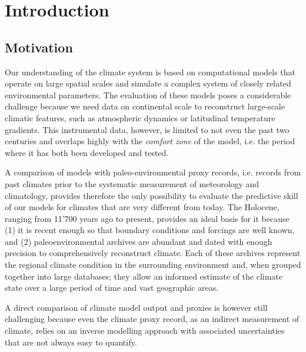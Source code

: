 
\chapter{Introduction}

\label{chp:intro}

\begin{refsection}


\section{Motivation} \label{sec:motivation}
Our understanding of the climate system is based on computational models that operate on large spatial scales and simulate a complex system of closely related environmental parameters. The evaluation of these models poses a considerable challenge because we need data on continental scale to reconstruct large-scale climatic features, such as atmospheric dynamics or latitudinal temperature gradients. This instrumental data, however, is limited to not even the past two centuries and overlaps highly with the \textit{comfort zone} of the model, i.e. the period where it has both been developed and tested. 

A comparison of models with paleo-environmental proxy records, i.e. records from past climates prior to the systematic measurement of meteorology and climatology, provides therefore the only possibility to evaluate the predictive skill of our models for climates that are very different from today. The Holocene, ranging from 11'700 years ago to present, provides an ideal basis for it because (1) it is recent enough so that boundary conditions and forcings are well known, and (2) paleoenvironmental archives are abundant and dated with enough precision to comprehensively reconstruct climate. Each of these archives represent the regional climate condition in the surrounding environment and, when grouped together into large databases; they allow an informed estimate of the climate state over a large period of time and vast geographic areas.

A direct comparison of climate model output and proxies is however still challenging because even the  climate proxy record, as an indirect measurement of climate, relies on an inverse modelling approach with associated uncertainties that are not always easy to quantify.


\end{refsection}
